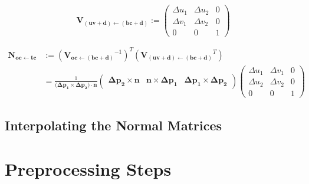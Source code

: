 \documentclass{article}
\newcommand{\vctr}[1]{\mathbf{#1}}
\newcommand{\point}[1]{\mathbf{#1}}
\newcommand{\mat}[1]{\mathbf{#1}}
\newcommand{\vMat}[2]{\mat{V_{#1 \leftarrow #2}}}
\newcommand{\nMat}[2]{\mat{N_{#1 \leftarrow #2}}}
\begin{document}
\begin{equation}
 \vMat{(uv+d)}{(bc+d)} := \begin{pmatrix} 
                  \Delta u_1 & \Delta u_2 & 0 \\
                  \Delta v_1 & \Delta v_2 & 0 \\
                  0 & 0 & 1 
                 \end{pmatrix}
\end{equation}

\begin{align*}
\nMat{oc}{tc} &:= (\vMat{oc}{(bc+d)}^{-1})^T(\vMat{(uv+d)}{(bc+d)}^T) \\
  &= \frac{1}{(\point{\Delta p_1} \times \point{\Delta p_2)}\cdot \vctr{n}}\begin{pmatrix} 
        \point{\Delta p_2} \times \vctr{n} & \vctr{n} \times \point{\Delta p_1} & \point{\Delta p_1} \times \point{\Delta p_2}
     \end{pmatrix}
     \begin{pmatrix} 
                  \Delta u_1 & \Delta v_1 & 0 \\
                  \Delta u_2 & \Delta v_2 & 0 \\
                  0 & 0 & 1 
     \end{pmatrix}
\end{align*}

\subsection{Interpolating the Normal Matrices}

\section{Preprocessing Steps}
\end{document}
